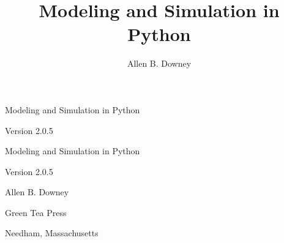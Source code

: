\documentclass[12pt]{book}
\title{Modeling and Simulation in Python}
\author{Allen B. Downey}
\newcommand{\thetitle}{Modeling and Simulation in Python}
\newcommand{\theauthors}{Allen B. Downey}
\newcommand{\theversion}{2.0.5}
\theoremstyle{exercise}
\newcommand\blankpage{%
    \null
    \thispagestyle{empty}%
    \addtocounter{page}{-1}%
    \newpage}
\newif\ifplastex
\begin{document}
\frontmatter

\ifplastex

\maketitle

\else

\begin{latexonly}

\thispagestyle{empty}

\begin{flushright}
\vspace*{2.0in}

\begin{spacing}{3}
{\huge \thetitle}
\end{spacing}

\vspace{0.25in}

Version \theversion

\vfill

\end{flushright}


\afterpage{\blankpage}


\pagebreak
\thispagestyle{empty}

\begin{flushright}
\vspace*{2.0in}

\begin{spacing}{3}
{\huge \thetitle}
\end{spacing}

\vspace{0.25in}

Version \theversion

\vspace{1in}


{\Large
\theauthors \\
}


\vspace{0.5in}

{\Large Green Tea Press}

{\small Needham, Massachusetts}


\end{flushright}
\end{latexonly}
\end{document}
